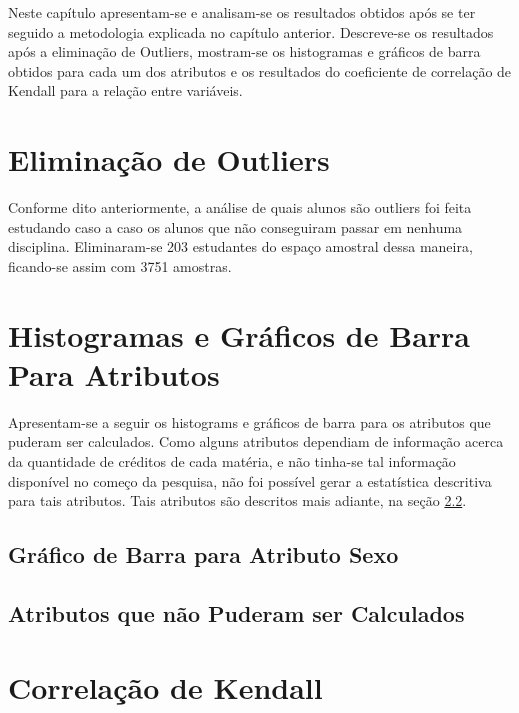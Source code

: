 Neste capítulo apresentam-se e analisam-se os resultados obtidos após se ter seguido a
metodologia explicada no capítulo anterior. Descreve-se os resultados após a
eliminação de Outliers, mostram-se os histogramas e gráficos de barra obtidos para
cada um dos atributos e os resultados do coeficiente de correlação de Kendall para a
relação entre variáveis. 

\section{Eliminação de Outliers}
Conforme dito anteriormente, a análise de quais alunos são outliers foi feita
estudando caso a caso os alunos que não conseguiram passar em nenhuma disciplina.
Eliminaram-se 203 estudantes do espaço amostral dessa maneira, ficando-se assim com
3751 amostras. 

\section{Histogramas e Gráficos de Barra Para Atributos}
Apresentam-se a seguir os histograms e gráficos de barra para os atributos que puderam
ser calculados. Como alguns atributos dependiam de informação acerca da quantidade de
créditos de cada matéria, e não tinha-se tal informação disponível no começo da
pesquisa, não foi possível gerar a estatística descritiva para tais atributos. Tais
atributos são descritos mais adiante, na seção \ref{atributos_problematicos}.

\subsection{Gráfico de Barra para Atributo Sexo}


\subsection{Atributos que não Puderam ser Calculados} \label{atributos_problematicos}

\section{Correlação de Kendall}

